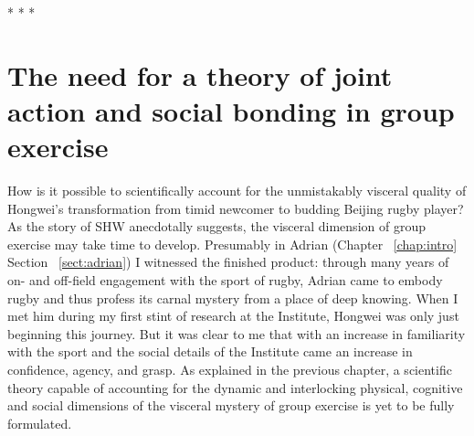 \begin{CJK}{UTF8}{gbsn}
                          \begin{center}
                            * * *
                          \end{center}





\section{The need for a theory of joint action and social bonding in group exercise}

How is it possible to scientifically account for the unmistakably visceral quality of Hongwei's transformation from timid newcomer to budding Beijing rugby player?  As the story of SHW anecdotally suggests, the visceral dimension of group exercise may take time to develop.  Presumably in Adrian (Chapter ~\ref{chap:intro} Section ~\ref{sect:adrian}) I witnessed the finished product: through many years of on- and off-field engagement with the sport of rugby, Adrian came to embody rugby and thus profess its carnal mystery from a place of deep knowing.  When I met him during my first stint of research at the Institute, Hongwei was only just beginning this journey.  But it was clear to me that with an increase in familiarity with the sport and the social details of the Institute came an increase in confidence, agency, and grasp.   As explained in the previous chapter, a scientific theory capable of accounting for the dynamic and interlocking physical, cognitive and social dimensions of the visceral mystery of group exercise is yet to be fully formulated.


\end{CJK}
